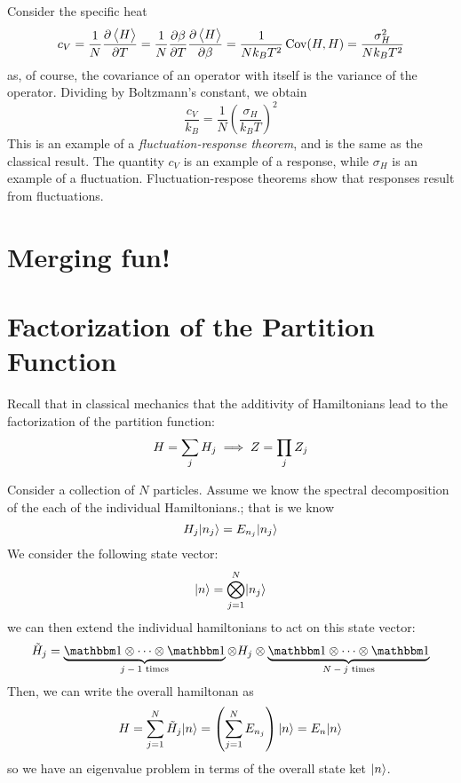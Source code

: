 Consider the specific heat
\[c_V = \frac{1}{N}\frac{\partial \left\langle \begin{matrix}H\end{matrix} \right\rangle}{\partial T} = \frac{1}{N}\frac{\partial \beta}{\partial T}\frac{\partial \left\langle \begin{matrix}H\end{matrix} \right\rangle}{\partial \beta} = \frac{1}{Nk_BT^2}\operatorname{Cov}(H,H) = \frac{\sigma_H^2}{Nk_BT^2}\]
as, of course, the covariance of an operator with itself is the variance of the operator. Dividing by Boltzmann's constant, we obtain
\begin{equation}
	\frac{c_V}{k_B} = \frac{1}{N}\left(\frac{\sigma_H}{k_BT}\right)^2
\end{equation}
This is an example of a \emph{fluctuation-response theorem}, and is the same as the classical result. The quantity \(c_V\) is an example of a response, while \(\sigma_H\) is an example of a fluctuation. Fluctuation-respose theorems show that responses result from fluctuations.

\section{Merging fun!}

\section{Factorization of the Partition Function}
Recall that in classical mechanics that the additivity of Hamiltonians lead to the factorization of the partition function:
\[H = \sum_j H_j \implies Z = \prod_j Z_j\]

Consider a collection of \(N\) particles. Assume we know the spectral decomposition of the each of the individual Hamiltonians.; that is we know
\[H_j\lvert n_j\rangle = E_{n_j}\lvert n_j\rangle\]
We consider the following state vector:
\[\lvert n\rangle = \bigotimes_{j=1}^N\lvert n_j\rangle\]
we can then extend the individual hamiltonians to act on this state vector:
\[\tilde H_j = \underbrace{\mathbbm 1 \tp \dots \tp \mathbbm 1}_{\text{\(j-1\) times}}\tp H_j \tp \underbrace{\mathbbm 1 \tp \dots \tp \mathbbm 1}_{\text{\(N-j\) times}}\]
Then, we can write the overall hamiltonan as
\[H = \sum_{j=1}^N\tilde H_j \lvert n\rangle = \left(\sum_{j=1}^NE_{n_j}\right)\lvert n\rangle = E_n\lvert n\rangle\]
so we have an eigenvalue problem in terms of the overall state ket \(\lvert n\rangle\).

